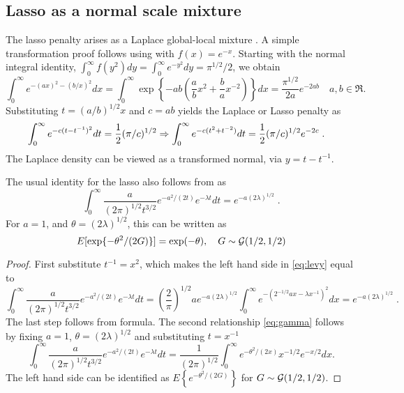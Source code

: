 \documentclass[lineno]{biometrika}
\begin{document}
\subsection{Lasso as a normal scale mixture}
The lasso penalty arises as a Laplace global-local mixture
\citep{andrews_scale_1974}.  A simple transformation proof follows using \CS{}
with $f(x) = e^{-x}$.  Starting with the normal integral identity, 
$\int_{0}^{\infty} f(y^2) dy = \int_0^\infty e^{-y^2} dy = \pi^{1/2}/2 $, we
obtain
\[
\int_0^\infty e^{-(a x)^2 - (b/x)^2} d x = \int_0^{\infty} 
\exp\left\{-a b \left(\frac{a}{b} x^2 + \frac{b}{a} x^{-2} \right)\right\} dx 
= \frac{\pi^{1/2}}{2a} e^{-2 a b}
\quad a,b \in \Re.
\]
Substituting $t = (a/b)^{1/2} x$ and $c = ab$ yields the Laplace or Lasso penalty as
\begin{align*}
  \int_0^\infty e^{- c (t - t^{-1})^2} dt 
  &= \frac{1}{2} (\pi/c)^{1/2} 
  \Rightarrow \int_0^\infty e^{- c (t^2 + t^{-2})} dt 
  = \frac{1}{2} (\pi/c)^{1/2} e^{-2c}
  \;. 
\end{align*}
The Laplace density can be viewed as a transformed normal, via $y = t - t^{-1}$.

\begin{proposition}
The usual identity for the lasso also follows from \citet{levy1940certains} as
\begin{equation}
  \int_{0}^{\infty} \frac{a}{(2 \pi)^{1/2} t^{3/2}} e^{-{a^2}/({2 t})} e^{-\lambda t} dt = e^{-a (2 \lambda)^{1/2} } \;.\label{eq:levy}
\end{equation}
For $a = 1$, and $\theta = (2 \lambda)^{1/2}$, this can be written as 
\begin{equation}
  E [\exp\{-\theta^2/(2G)\}] = \exp(-\theta),\quad G \sim \GammaRV(1/2, 1/2) 
  \label{eq:gamma}
\end{equation}
\end{proposition}

\begin{proof}
First substitute $t^{-1} = x^2$, which makes the left hand side in
\eqref{eq:levy} equal to 
\[
  \int_{0}^{\infty} \frac{a}{(2 \pi)^{1/2} t^{3/2}} e^{-{a^2}/({2 t})} e^{-\lambda t} dt = \left(\frac{2}{\pi}\right)^{1/2}ae^{-a (2 \lambda)^{1/2}} 
  \int_0^{\infty} e^{-({2}^{-1/2} ax - \lambda x^{-1})^2} dx = e^{-a (2 \lambda)^{1/2}}
  \;.
\]
The last step follows from \CS{} formula.  The second relationship \eqref{eq:gamma} follows by fixing $a = 1$, $\theta = (2\lambda)^{1/2}$ and
substituting $t = x^{-1}$
\[
\int_{0}^{\infty} \frac{a}{(2 \pi)^{1/2} t^{3/2}} 
e^{-{a^2}/({2 t})} e^{-\lambda t} dt 
= \frac{1}{(2 \pi)^{1/2}} \int_{0}^{\infty} e^{-{\theta^2}/({2x})} 
x^{-1/2} e^{-x/2} dx.
\]
The left hand side can be identified as 
$E\left\{e^{-\theta^2 / (2 G) } \right\}$ for 
$G \sim \mathcal{G}(1/2, 1/2)$. 
\end{proof}
\end{document}
